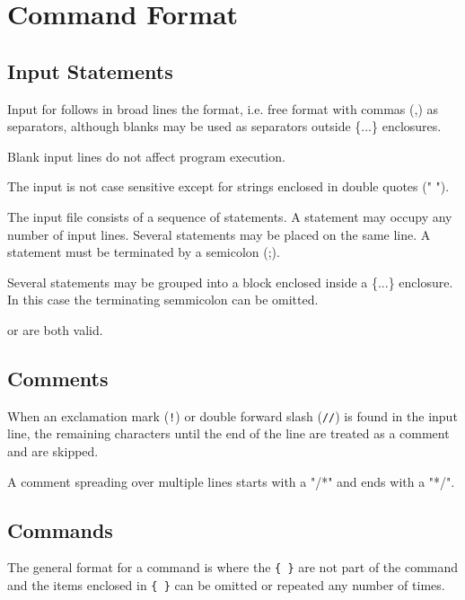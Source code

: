 
\chapter{Command Format}


\section{Input Statements}

Input for \madx follows in broad lines the
\href{http://cern.ch/mad9}{\madnine} format, i.e. free
format with commas (,) as separators, although blanks may be used as
separators outside \{...\} enclosures. 
 
Blank input lines do not affect program execution. 

The input is not case sensitive except for strings enclosed in double
quotes (" "). 

The input file consists of a sequence of statements. 
A statement may occupy any number of input lines. 
Several statements may be placed on the same line.
A statement must be terminated by a semicolon (;).

Several statements may be grouped into a block enclosed inside a \{...\}
enclosure. In this case the terminating semmicolon can be omitted.

or
are both valid.

\section{Comments}
When an exclamation mark ({\tt !}) or double forward slash ({\tt //}) is
found in the input line, the remaining characters until the end of the
line are treated as a comment and are skipped. 

A comment spreading over multiple lines starts with a "/*" and ends with a "*/".

\section{Commands}
The general format for a command is 
where the  {\tt \{ \}} are not part of the command and the items
enclosed in {\tt \{ \}} can be omitted or repeated any number of times. 


